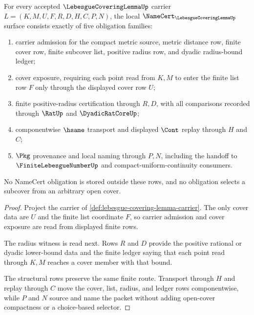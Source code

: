 \begin{theorem}
\label{thm:lebesgue-covering-lemma-namecert-obligations}
For every accepted $\LebesgueCoveringLemmaUp$ carrier $L=(K,M,U,F,R,D,H,C,P,N)$, the local $\NameCert_{\LebesgueCoveringLemmaUp}$ surface consists exactly of five obligation families:
\begin{enumerate}
\item carrier admission for the compact metric source, metric distance row, finite cover row, finite subcover list, positive radius row, and dyadic radius-bound ledger;
\item cover exposure, requiring each point read from $K,M$ to enter the finite list row $F$ only through the displayed cover row $U$;
\item finite positive-radius certification through $R,D$, with all comparisons recorded through $\RatUp$ and $\DyadicRatCoreUp$;
\item componentwise $\hsame$ transport and displayed $\Cont$ replay through $H$ and $C$;
\item $\Pkg$ provenance and local naming through $P,N$, including the handoff to $\FiniteLebesgueNumberUp$ and compact-uniform-continuity consumers.
\end{enumerate}
No NameCert obligation is stored outside these rows, and no obligation selects a subcover from an arbitrary open cover.
\end{theorem}
\begin{proof}
Project the carrier of \autoref{def:lebesgue-covering-lemma-carrier}. The only cover data are $U$ and the finite list coordinate $F$, so carrier admission and cover exposure are read from displayed finite rows.

The radius witness is read next. Rows $R$ and $D$ provide the positive rational or dyadic lower-bound data and the finite ledger saying that each point read through $K,M$ reaches a cover member with that bound.

The structural rows preserve the same finite route. Transport through $H$ and replay through $C$ move the cover, list, radius, and ledger rows componentwise, while $P$ and $N$ source and name the packet without adding open-cover compactness or a choice-based selector.
\end{proof}

